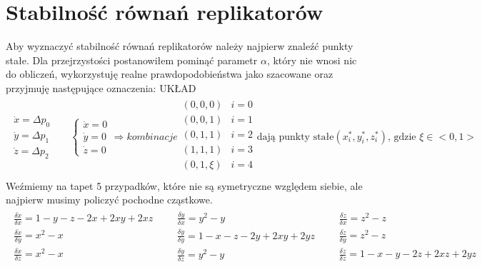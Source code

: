 \section{Stabilność równań replikatorów}
\label{sec:stab_repl}
Aby wyznaczyć stabilność równań replikatorów należy najpierw znaleźć punkty stałe. Dla przejrzystości postanowiłem pominąć parametr $\alpha$, który nie wnosi nic do obliczeń, wykorzystuję realne prawdopodobieństwa jako szacowane oraz przyjmuję następujące oznaczenia:
{\color{red} UKŁAD}
\begin{align*}
\begin{array}{l}
\dot{x} = \Delta p_0 \\
\dot{y} = \Delta p_1 \\
\dot{z} = \Delta p_2
\end{array}
&&
\left\{
\begin{array}{l}
\dot{x} = 0 \\
\dot{y} = 0 \\
\dot{z} = 0 
\end{array}
\right.
\Rightarrow kombinacje
\begin{array}{ll}
(0,0,0)  & i=0 \\
(0,0,1) & i=1 \\
(0,1,1) & i=2 \\
(1,1,1) & i=3 \\
(0,1,\xi) & i=4 \\ 
\end{array}
\text{dają punkty stałe} (x^*_i, y^*_i, z^*_i)\text{, gdzie }\xi \in <0,1>
\end{align*}
Weźmiemy na tapet 5 przypadków, które nie są symetryczne względem siebie, ale najpierw musimy policzyć pochodne cząstkowe.
\begin{align*}
\begin{array}{l}
\frac{\delta \dot{x}}{\delta x} = 1-y-z-2x+2xy+2xz\\
\frac{\delta \dot{x}}{\delta y} = x^2 - x\\
\frac{\delta \dot{x}}{\delta z} = x^2 - x\\
\end{array}
&&
\begin{array}{l}
\frac{\delta \dot{y}}{\delta x} = y^2 - y\\
\frac{\delta \dot{y}}{\delta y} = 1-x-z-2y+2xy+2yz\\
\frac{\delta \dot{y}}{\delta z} = y^2 - y\\
\end{array}
&&
\begin{array}{l}
\frac{\delta \dot{z}}{\delta x} = z^2 - z\\
\frac{\delta \dot{z}}{\delta y} = z^2 - z\\
\frac{\delta \dot{z}}{\delta z} = 1-x-y-2z+2xz+2yz\\
\end{array}
\end{align*}

